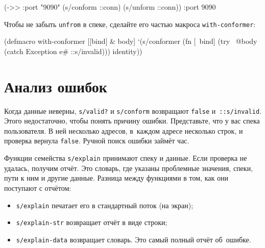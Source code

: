 \begin{english}
  \begin{clojure}
(->> {:port "9090"}
     (s/conform ::conn)
     (s/unform ::conn))
{:port 9090}
  \end{clojure}
\end{english}

Чтобы не забыть \verb|unfrom| в спеке, сделайте его частью макроса
\verb|with-conformer|:

\begin{english}
  \begin{clojure}
(defmacro with-conformer
  [[bind] & body]
  `(s/conformer
    (fn [~bind]
      (try
        ~@body
        (catch Exception e#
          ::s/invalid)))
    identity))
  \end{clojure}
\end{english}

\section{Анализ ошибок}


\label{spec-explain}

Когда данные неверны, \verb|s/valid?| и \verb|s/conform| возвращают \verb|false|
и~\verb|::s/invalid|. Этого недостаточно, чтобы понять причину
ошибки. Представьте, что у вас спека пользователя. В ней несколько адресов,
в~каждом адресе несколько строк, и проверка вернула \verb|false|. Ручной поиск
ошибки займёт час.

Функции семейства \verb|s/explain| принимают спеку и данные. Если проверка не
удалась, получим отчёт. Это словарь, где указаны проблемные значения, спеки,
пути к ним и другие данные. Разница между функциями в том, как они поступают с
отчётом:

\begin{itemize}


\item
  \verb|s/explain| печатает его в стандартный поток (на экран);

\item
  \verb|s/explain-str| возвращает отчёт в виде строки;

\item
  \verb|s/explain-data| возвращает словарь. Это самый полный отчёт об~ошибке.

\end{itemize}

